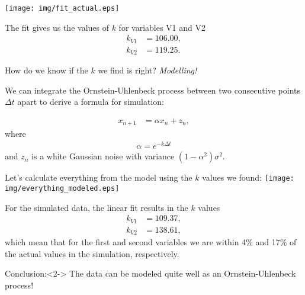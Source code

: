 \documentclass{beamer}
\begin{document}
\begin{frame}
\centering
\texttt{[image: img/fit\_actual.eps]}

The fit gives us the values of $k$ for variables V1 and V2
\begin{align*}
 k_{V1} &= 106.00,\\
 k_{V2} &= 119.25.
\end{align*}

\end{frame}

\begin{frame}
How do we know if the $k$ we find is right? \emph{Modelling!}

We can integrate the Ornstein-Uhlenbeck process between two consecutive points $\Delta t$ apart to derive a formula for simulation:

\begin{align*}
x_{n+1} &= \alpha x_n + z_n,
\end{align*}
where
\begin{align*}
 \alpha = e^{-k \Delta t}
\end{align*}
and $z_n$ is a white Gaussian noise with variance $(1-\alpha^2) \sigma^2$.
\end{frame}

\begin{frame}
Let's calculate everything from the model using the $k$ values we found:
\centering
\texttt{[image: img/everything\_modeled.eps]}\\

\end{frame}

\begin{frame}
For the simulated data, the linear fit results in the $k$ values
\begin{align*}
 k_{V1} &= 109.37,\\
 k_{V2} &= 138.61,
\end{align*}
which mean that for the first and second variables we are within 4\% and 17\% of the actual values in the simulation, respectively.

\begin{block}{Conclusion:}<2->
The data can be modeled quite well as an Ornstein-Uhlenbeck process!
\end{block}

\end{frame}
\end{document}
